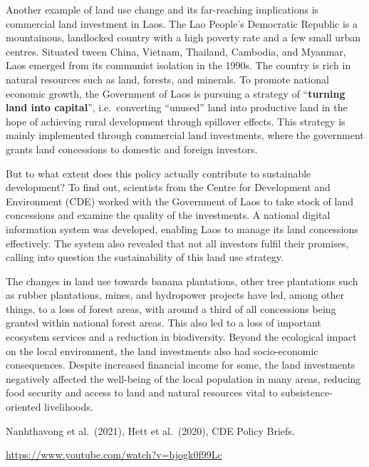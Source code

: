 \documentclass[
  a4paper,
  openany]{book}
\begin{document}
\begin{tcolorbox}[enhanced jigsaw, coltitle=black, bottomtitle=1mm, opacitybacktitle=0.6, titlerule=0mm, opacityback=0, leftrule=.75mm, colbacktitle=quarto-callout-tip-color!10!white, bottomrule=.15mm, toptitle=1mm, breakable, title={Example: Land investments in Laos}, arc=.35mm, rightrule=.15mm, toprule=.15mm, left=2mm, colback=white, colframe=quarto-callout-tip-color-frame]

Another example of land use change and its far-reaching implications is
commercial land investment in Laos. The Lao People's Democratic Republic
is a mountainous, landlocked country with a high poverty rate and a few
small urban centres. Situated tween China, Vietnam, Thailand, Cambodia,
and Myanmar, Laos emerged from its communist isolation in the 1990s. The
country is rich in natural resources such as land, forests, and
minerals. To promote national economic growth, the Government of Laos is
pursuing a strategy of ``\textbf{turning land into capital}'',
i.e.~converting ``unused'' land into productive land in the hope of
achieving rural development through spillover effects. This strategy is
mainly implemented through commercial land investments, where the
government grants land concessions to domestic and foreign investors.

But to what extent does this policy actually contribute to sustainable
development? To find out, scientists from the Centre for Development and
Environment (CDE) worked with the Government of Laos to take stock of
land concessions and examine the quality of the investments. A national
digital information system was developed, enabling Laos to manage its
land concessions effectively. The system also revealed that not all
investors fulfil their promises, calling into question the
sustainability of this land use strategy.

The changes in land use towards banana plantations, other tree
plantations such as rubber plantations, mines, and hydropower projects
have led, among other things, to a loss of forest areas, with around a
third of all concessions being granted within national forest areas.
This also led to a loss of important ecosystem services and a reduction
in biodiversity. Beyond the ecological impact on the local environment,
the land investments also had socio-economic consequences. Despite
increased financial income for some, the land investments negatively
affected the well-being of the local population in many areas, reducing
food security and access to land and natural resources vital to
subsistence-oriented livelihoods.

Nanhthavong et al.~(2021), Hett et al.~(2020), CDE Policy Briefs.~

\url{https://www.youtube.com/watch?v=bjogk0f99Lc}

\end{tcolorbox}
\end{document}
